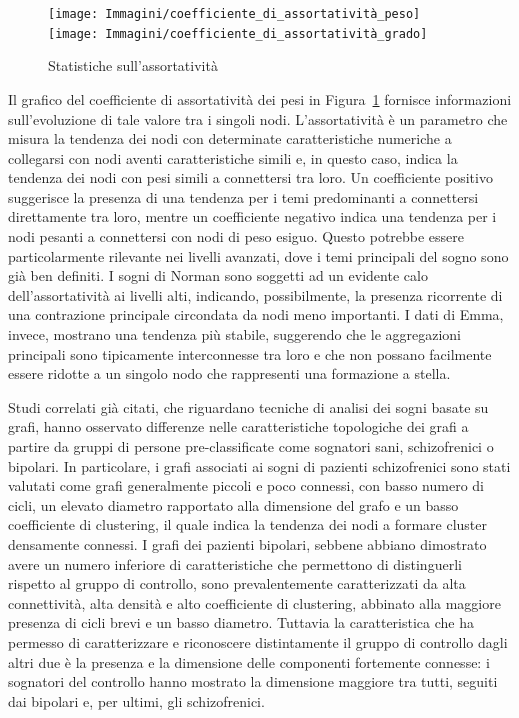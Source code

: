 \begin{figure}[t]
    \hspace{-5pt}
    \texttt{[image: Immagini/coefficiente\_di\_assortatività\_peso]}
    \hspace{-20pt}
    \texttt{[image: Immagini/coefficiente\_di\_assortatività\_grado]}
    \hspace{-5pt}
    \vspace{-10pt}
    \caption{Statistiche sull'assortatività}\label{fig:assortativity}
\end{figure}

Il grafico del coefficiente di assortatività dei pesi in Figura~\ref{fig:assortativity} fornisce informazioni
sull'evoluzione di tale valore tra i singoli nodi.
L'assortatività è un parametro che misura la tendenza dei nodi con determinate caratteristiche numeriche a collegarsi
con nodi aventi caratteristiche simili e, in questo caso, indica la tendenza dei nodi con pesi simili a connettersi tra
loro.
Un coefficiente positivo suggerisce la presenza di una tendenza per i temi predominanti a connettersi direttamente
tra loro, mentre un coefficiente negativo indica una tendenza per i nodi pesanti a connettersi con nodi di peso esiguo.
Questo potrebbe essere particolarmente rilevante nei livelli avanzati, dove i temi principali del sogno sono già ben
definiti.
I sogni di Norman sono soggetti ad un evidente calo dell'assortatività ai livelli alti, indicando, possibilmente,
la presenza ricorrente di una contrazione principale circondata da nodi meno importanti.
I dati di Emma, invece, mostrano una tendenza più stabile, suggerendo che le aggregazioni principali sono tipicamente
interconnesse tra loro e che non possano facilmente essere ridotte a un singolo nodo che rappresenti una formazione a
stella.


Studi correlati già citati, che riguardano tecniche di analisi dei sogni basate su grafi, hanno osservato differenze
nelle caratteristiche topologiche dei grafi a partire da gruppi di persone pre-classificate come sognatori sani,
schizofrenici o bipolari.
In particolare, i grafi associati ai sogni di pazienti schizofrenici sono stati valutati come grafi generalmente
piccoli e poco connessi, con basso numero di cicli, un elevato diametro rapportato alla dimensione del grafo e un
basso coefficiente di clustering, il quale indica la tendenza dei nodi a formare cluster densamente connessi.
I grafi dei pazienti bipolari, sebbene abbiano dimostrato avere un numero inferiore di caratteristiche che permettono
di distinguerli rispetto al gruppo di controllo, sono prevalentemente caratterizzati da alta connettività, alta densità
e alto coefficiente di clustering, abbinato alla maggiore presenza di cicli brevi e un basso diametro.
Tuttavia la caratteristica che ha permesso di caratterizzare e riconoscere distintamente il gruppo di controllo
dagli altri due è la presenza e la dimensione delle componenti fortemente connesse: i sognatori del controllo hanno
mostrato la dimensione maggiore tra tutti, seguiti dai bipolari e, per ultimi, gli schizofrenici. \newline


